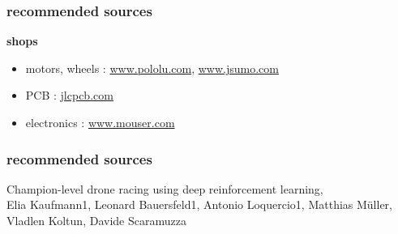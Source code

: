 \documentclass{beamer}
\begin{document}
\begin{frame}
  \frametitle{\bf recommended sources}

  {\bf shops}
  \begin{itemize}
    \item motors, wheels : \url{www.pololu.com}, \url{www.jsumo.com}
    \item PCB : \url{jlcpcb.com}
    \item electronics : \url{www.mouser.com}
  \end{itemize}

\end{frame}


\begin{frame}

  \frametitle{\bf recommended sources}
  Champion-level drone racing using deep reinforcement learning, \\
  Elia Kaufmann1, Leonard Bauersfeld1, Antonio Loquercio1, Matthias Müller, Vladlen Koltun, Davide Scaramuzza \\
  

\end{frame}
\end{document}
